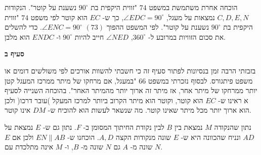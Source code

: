 \documentclass[12pt,a4paper]{article}
\begin{document}
\begin{center}
\end{center}
הוכחה אחרת משתמשת במשפט
$74$
"זווית היקפית בת 
$90^\circ$
נשענת על קוטר". הנקודות
$C,D,E,N$
נמצאות על מעגל, 
$\angle EDC=90^\circ$,
כך ש-%
$EC$
הוא קוטר לפי משפט
$74$
"זווית היקפית בת
$90^\circ$
נשענת על קוטר". לפי המשפט ההפוך
$(73)$
$\angle ENC=90^\circ$.
כדי להשלים את סכום הזוויות במרובע ל-%
$360^\circ$,
$\angle NED$
חייב להיות 
$90^\circ$
ו-%
$ENDC$
הוא מלבן.


\textbf{סעיף ב}

בזבזתי הרבה זמן בנסיונות לפתור סעיף זה כי חשבתי להשוות אורכים לפי משולשים דומים או משפט פיתגורס. לבסוף נזכרתי במשפט
$66$
"במעגל, אם מרחקו של מיתר ממרכז המעגל קטן יותר ממרחקו של מיתר אחר, אז מיתר זה ארוך יותר מהמיתר האחר". בהוכחה השנייה לסעיף א ראינו ש-%
$EC$
הוא קוטר, וקוטר הוא מיתר הקרוב ביותר למרכז המעקל )עובר דרכו( ולכן הוא ארוך יותר מכל מיתר שאינו קוטר. מה שנשאר לעשות הוא להוכיח ש-%
$DM$
אינו קוטר.

נתון שהנקודה
$M$
נמצאת בין 
$B$
לבין נקודת החיתוך המסומן ב-%
$F$.
נתון גם ש-%
$E$
נמצאת על
$AD$
ונניח שהכוונה היא ש-%
$E$
שונה מנקודות הקצה
$A,D$.
הוכחנו ש-%
$EN\|AB$
ולכן אם 
$E$
שונה מ-%
$A$
גם
$N$
שונה מ-%
$B$,
ו-%
$M$
אינה מתלכדת עם
$N$.
\vspace{-4mm}
\end{document}
